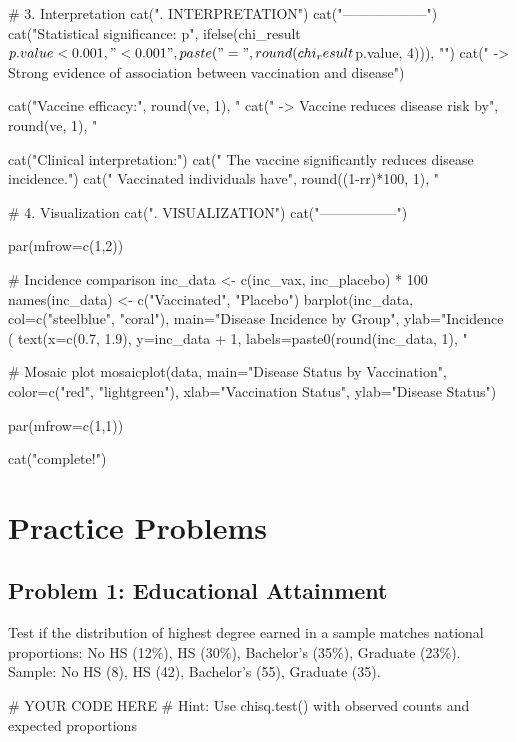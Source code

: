 \documentclass[11pt]{article}
\begin{document}
\begin{rcode}
# 3. Interpretation
cat(". INTERPRETATION\n")
cat("------------------\n")
cat("Statistical significance: p", ifelse(chi_result$p.value < 0.001,
    "< 0.001", paste("=", round(chi_result$p.value, 4))), "\n")
cat("  -> Strong evidence of association between vaccination and disease\n\n")

cat("Vaccine efficacy:", round(ve, 1), "%
cat("  -> Vaccine reduces disease risk by", round(ve, 1), "%

cat("Clinical interpretation:\n")
cat("  The vaccine significantly reduces disease incidence.\n")
cat("  Vaccinated individuals have", round((1-rr)*100, 1),
    "%

# 4. Visualization
cat("\n{}. VISUALIZATION\n")
cat("-----------------\n")

par(mfrow=c(1,2))

# Incidence comparison
inc_data <- c(inc_vax, inc_placebo) * 100
names(inc_data) <- c("Vaccinated", "Placebo")
barplot(inc_data, col=c("steelblue", "coral"),
        main="Disease Incidence by Group",
        ylab="Incidence (%
text(x=c(0.7, 1.9), y=inc_data + 1, labels=paste0(round(inc_data, 1), "%

# Mosaic plot
mosaicplot(data, main="Disease Status by Vaccination",
           color=c("red", "lightgreen"),
           xlab="Vaccination Status", ylab="Disease Status")

par(mfrow=c(1,1))

cat("\nAnalysis complete!\n")
\end{rcode}

\section{Practice Problems}

\subsection{Problem 1: Educational Attainment}

Test if the distribution of highest degree earned in a sample matches national proportions: No HS (12\%), HS (30\%), Bachelor's (35\%), Graduate (23\%). Sample: No HS (8), HS (42), Bachelor's (55), Graduate (35).

\begin{rcode}
# YOUR CODE HERE
# Hint: Use chisq.test() with observed counts and expected proportions
\end{rcode}
\end{document}
